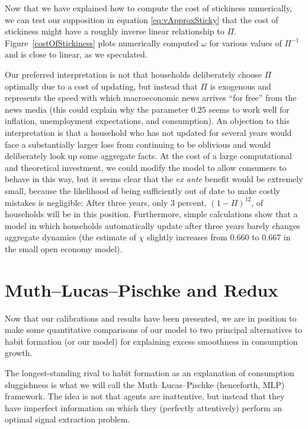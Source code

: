 \documentclass[titlepage]{\econtex}\newcommand{\texname}{cAndCwithStickyE}
\begin{document}
Now that we have explained how to compute the cost of stickiness numerically, we can test our supposition in equation \eqref{eq:vApproxSticky} that the cost of stickiness might have a roughly inverse linear relationship to $\Pi$.  Figure~\ref{costOfStickiness} plots numerically computed $\omega$ for various values of $\Pi^{-1}$ and is close to linear, as we speculated.

Our preferred interpretation is not that households deliberately choose $\Pi$ optimally due to a cost of updating, but instead that $\Pi$ is exogenous and represents the speed with which macroeconomic news arrives ``for free'' from the news media (this could explain why the parameter $0.25$ seems to work well for inflation, unemployment expectations, and consumption). An objection to this interpretation is that a household who has not updated for several years would face a substantially larger loss from continuing to be oblivious and would deliberately look up some aggregate facts.    At the cost of a large computational and theoretical investment, we could modify the model to allow consumers to behave in this way, but it seems clear that the {\it ex ante} benefit would be extremely small, because the likelihood of being sufficiently out of date to make costly mistakes is negligible:   After three years, only 3 percent, $(1-\Pi)^{12}$, of households will be in this position.  Furthermore, simple calculations show that a model in which households automatically update after three years barely changes aggregate dynamics (the estimate of $\chi$ slightly increases from 0.660 to 0.667 in the small open economy model).

\section{Muth--Lucas--Pischke and \cite{reis:inattentive} Redux} \label{sec:Comparisons}

Now that our calibrations and results have been presented, we are in position to make some quantitative comparisons of our model to two principal alternatives to habit formation (or our model) for explaining excess smoothness in consumption growth.

The longest-standing rival to habit formation as an explanation of consumption sluggishness is what we will call the Muth--Lucas--Pischke (henceforth, MLP) framework.  The idea is not that agents are inattentive, but instead that they have imperfect information on which they (perfectly attentively) perform an optimal signal extraction problem.
\end{document}
